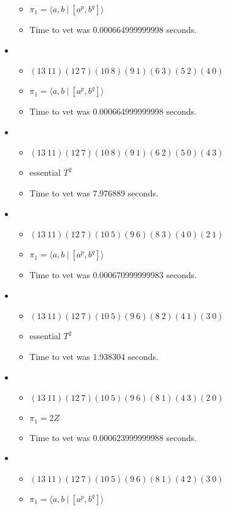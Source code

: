 \documentclass{article}
\begin{document}
\begin{itemize}
\begin{itemize}
      \item $\pi_1 = \langle a,b\ |\ [a^p,b^q]\rangle$
      \item Time to vet was 0.000664999999998 seconds.
\end{itemize}
\item \begin{itemize}
      \item $(13\ 11)(12\ 7)(10\ 8)(9\ 1)(6\ 3)(5\ 2)(4\ 0)$
      \item $\pi_1 = \langle a,b\ |\ [a^p,b^q]\rangle$
      \item Time to vet was 0.000664999999998 seconds.
\end{itemize}
\item \begin{itemize}
      \item $(13\ 11)(12\ 7)(10\ 8)(9\ 1)(6\ 2)(5\ 0)(4\ 3)$
      \item essential $T^2$
      \item Time to vet was 7.976889 seconds.
\end{itemize}
\item \begin{itemize}
      \item $(13\ 11)(12\ 7)(10\ 5)(9\ 6)(8\ 3)(4\ 0)(2\ 1)$
      \item $\pi_1 = \langle a,b\ |\ [a^p,b^q]\rangle$
      \item Time to vet was 0.000670999999983 seconds.
\end{itemize}
\item \begin{itemize}
      \item $(13\ 11)(12\ 7)(10\ 5)(9\ 6)(8\ 2)(4\ 1)(3\ 0)$
      \item essential $T^2$
      \item Time to vet was 1.938304 seconds.
\end{itemize}
\item \begin{itemize}
      \item $(13\ 11)(12\ 7)(10\ 5)(9\ 6)(8\ 1)(4\ 3)(2\ 0)$
      \item $\pi_1 =2 Z$
      \item Time to vet was 0.000623999999988 seconds.
\end{itemize}
\item \begin{itemize}
      \item $(13\ 11)(12\ 7)(10\ 5)(9\ 6)(8\ 1)(4\ 2)(3\ 0)$
      \item $\pi_1 = \langle a,b\ |\ [a^p,b^q]\rangle$

\end{itemize}
\end{itemize}
\end{document}
